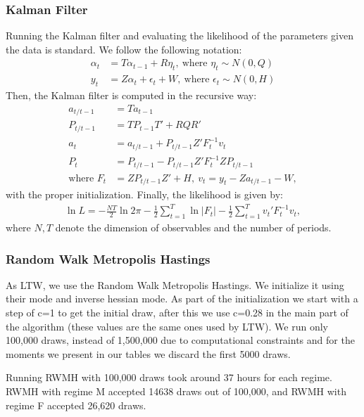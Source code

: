 \documentclass[letterpaper,12pt]{article}%
\begin{document}
\subsubsection*{Kalman Filter}
Running the Kalman filter and evaluating the likelihood of the parameters given the data is standard. We follow the following notation:
\begin{align*}
\alpha_t &= T \alpha_{t-1} + R \eta_t, \ \text{where } \eta_t \sim N(0,Q) \\
y_t &= Z \alpha_t + \epsilon_t + W, \ \text{where } \epsilon_t \sim N(0,H)
\end{align*}
Then, the Kalman filter is computed in the recursive way:
\begin{align*}
a_{t/t-1} &= T a_{t-1} \\
P_{t/t-1} &= T P_{t-1} T' + R Q R' \\
a_t &= a_{t/t-1} + P_{t/t-1} Z' F_t^{-1} v_t\\
P_t &= P_{t/t-1} - P_{t/t-1} Z' F_t^{-1} Z P_{t/t-1} \\
\text{where } F_t&= Z P_{t/t-1} Z' + H, \ v_t = y_t - Z a_{t/t-1} - W,
\end{align*}
with the proper initialization. Finally, the likelihood is given by:
\begin{align*}
\ln L = -\frac{NT}{2} \ln 2\pi - \frac{1}{2} \sum_{t=1}^{T} \ln |F_t| - \frac{1}{2} \sum_{t=1}^T v_t' F_t^{-1} v_t,
\end{align*}
where $N,T$ denote the dimension of observables and the number of periods.

\subsubsection*{Random Walk Metropolis Hastings}
As LTW, we use the Random Walk Metropolis Hastings. We initialize it using their mode and inverse hessian mode. As part of the initialization we start with a step of c=1 to get the initial draw, after this we use c=0.28 in the main part of the algorithm (these values are the same ones used by LTW). We run only 100,000 draws, instead of 1,500,000 due to computational constraints and for the moments we present in our tables we discard the first 5000 draws.

Running RWMH with 100,000 draws took around 37 hours for each regime. RWMH with regime M accepted 14638 draws out of 100,000, and RWMH with regime F accepted 26,620 draws.
\end{document}
